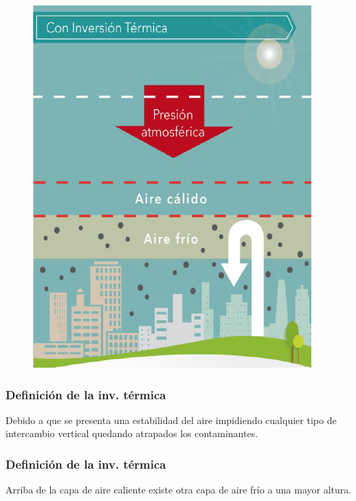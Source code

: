 \documentclass[14pt]{beamer}
\begin{document}
\begin{frame}
\begin{figure}
    \centering
    \includegraphics[scale=0.5]{Imagenes/Inversion_Termica_02.png}
\end{figure}
\end{frame}
\begin{frame}
\frametitle{Definición de la inv. térmica}
Debido a que se presenta una estabilidad del aire impidiendo cualquier tipo de intercambio vertical quedando atrapados los contaminantes.
\end{frame}
\begin{frame}
\frametitle{Definición de la inv. térmica}
Arriba de la capa de aire caliente existe otra capa de aire frío a una mayor altura.
\end{frame}
\end{document}
